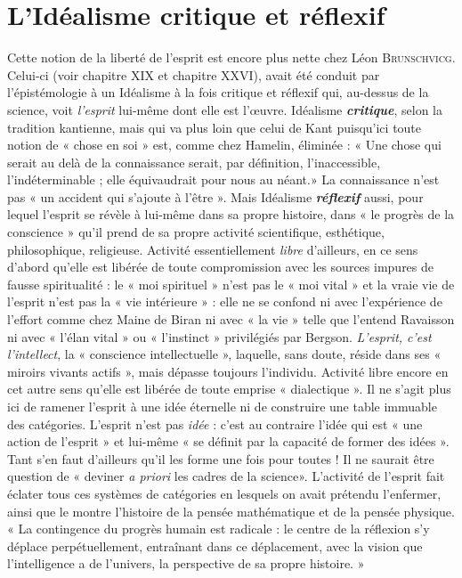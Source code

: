 \section{L’Idéalisme critique et réflexif}%
Cette notion de la
liberté de l’esprit est encore plus nette chez Léon \textsc{Brunschvicg}.
Celui-ci (voir chapitre XIX et chapitre XXVI), avait été conduit
par l’épistémologie à un Idéalisme à la fois critique et réflexif qui,
au-dessus de la science, voit {\it l’esprit} lui-même dont elle est l’œuvre.
Idéalisme \textbf{\textit {critique}}, selon la tradition kantienne, mais qui va plus
loin que celui de Kant puisqu’ici toute notion de « chose en soi » est,
comme chez Hamelin, éliminée : « Une chose qui serait au delà de
la connaissance serait, par définition, l’inaccessible, l’indéterminable ;
elle équivaudrait pour nous au néant.» La connaissance n’est pas
« un accident qui s’ajoute à l'être ». Mais Idéalisme \textbf{\textit {réflexif}} aussi,
pour lequel l'esprit se révèle à lui-même dans sa propre histoire, dans
« le progrès de la conscience » qu’il prend de sa propre activité scientifique,
esthétique, philosophique, religieuse. Activité essentiellement
{\it libre} d’ailleurs, en ce sens d’abord qu’elle est libérée de toute compromission
avec les sources impures de fausse spiritualité : le « moi
spirituel » n’est pas le « moi vital » et la vraie vie de l’esprit n’est pas la
« vie intérieure » : elle ne se confond ni avec l’expérience de l'effort
comme chez Maine de Biran ni avec « la vie » telle que l’entend Ravaisson
ni avec « l'élan vital » ou « l'instinct » privilégiés par Bergson.
{\it L'esprit, c’est l’intellect}, la « conscience intellectuelle », laquelle, sans
doute, réside dans ses « miroirs vivants actifs », mais dépasse toujours
l'individu. Activité libre encore en cet autre sens qu’elle est libérée
de toute emprise « dialectique ». Il ne s’agit plus ici de ramener l'esprit
à une idée éternelle ni de construire une table immuable des catégories.
L’esprit n’est pas {\it idée} : c’est au contraire l’idée qui est « une
action de l’esprit » et lui-même « se définit par la capacité de former
des idées ». Tant s’en faut d’ailleurs qu’il les forme une fois pour
toutes ! Il ne saurait être question de « deviner {\it a priori} les cadres de
la science». L'activité de l'esprit fait éclater tous ces systèmes
de catégories en lesquels on avait prétendu l’enfermer, ainsi que le
montre l’histoire de la pensée mathématique et de la pensée physique.
« La contingence du progrès humain est radicale : le centre de la
réflexion s’y déplace perpétuellement, entraînant dans ce déplacement,
avec la vision que l'intelligence a de l’univers, la perspective
de sa propre histoire. »

